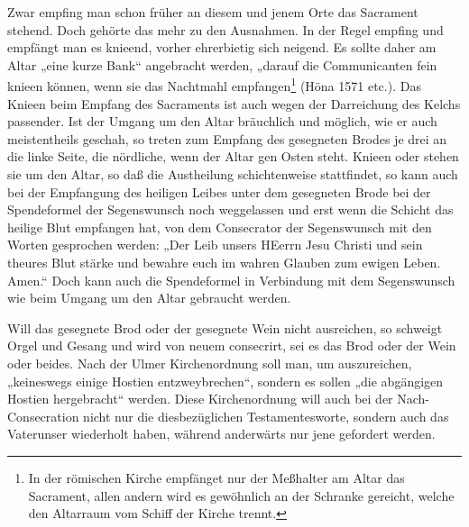 Zwar empfing man schon früher an diesem und jenem Orte das Sacrament stehend. Doch gehörte das mehr zu den Ausnahmen. In der Regel empfing und empfängt man es knieend, vorher ehrerbietig sich neigend. Es sollte daher am Altar „eine kurze Bank“ angebracht werden, „darauf die
Communicanten fein knieen können, wenn sie das Nachtmahl empfangen\footnote{In der römischen Kirche empfänget nur der Meßhalter am Altar das Sacrament, allen andern wird es gewöhnlich an der Schranke gereicht, welche den Altarraum vom Schiff der Kirche trennt.} (Höna 1571 etc.). Das Knieen beim Empfang des Sacraments ist auch wegen der Darreichung des Kelchs passender. Ist der Umgang um den Altar bräuchlich und möglich, wie er auch meistentheils geschah, so treten zum Empfang des gesegneten Brodes je drei an die linke Seite, die nördliche, wenn der Altar gen Osten steht. Knieen oder stehen sie um den Altar, so daß die Austheilung schichtenweise stattfindet, so kann auch bei der Empfangung des heiligen Leibes unter dem gesegneten Brode bei der Spendeformel der Segenswunsch noch weggelassen und erst wenn die Schicht das heilige Blut empfangen hat, von dem Consecrator der Segenswunsch mit den Worten gesprochen werden: „Der Leib unsers HEerrn Jesu Christi und sein theures Blut stärke und bewahre euch im wahren Glauben zum ewigen Leben. Amen.“ Doch kann auch die Spendeformel in Verbindung mit dem Segenswunsch wie beim Umgang um den Altar gebraucht werden.

Will das gesegnete Brod oder der gesegnete Wein nicht ausreichen, so schweigt Orgel und Gesang und wird von neuem consecrirt, sei es das Brod oder der Wein oder beides. Nach der Ulmer Kirchenordnung soll man, um auszureichen, „keineswegs einige Hostien entzweybrechen“, sondern es sollen „die abgängigen Hostien hergebracht“ werden. Diese Kirchenordnung will auch bei der Nach-Consecration nicht nur die diesbezüglichen Testamentesworte, sondern auch das Vaterunser wiederholt haben, während anderwärts nur jene gefordert werden.

